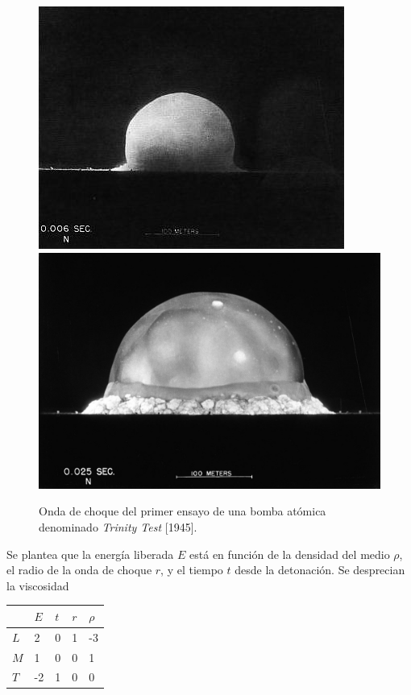   \begin{figure}[thb!]
  	\centering
  	\includegraphics[width=0.9\linewidth]{fig/trinity1.jpg}
  	\includegraphics[width=0.9\linewidth]{fig/trinity2.jpg}
  	\caption{Onda de choque del primer ensayo de una bomba atómica denominado \textit{Trinity Test} [1945]. }
  	\label{fig:trinity}
  \end{figure}
 
 Se plantea que la energía liberada $E$ está en función de la densidad del medio $\rho$, el radio de la onda de choque $r$, y el tiempo $t$ desde la detonación. Se desprecian la viscosidad 
 
\begin{table}[htb!]
	\centering
	\begin{tabular}{l||l|lll}
		& $E$ & $t$ & $r$ & $\rho$ \\ \hline
		$L$ & 2   & 0   & 1   & -3     \\ \hline
		$M$ & 1   & 0   & 0   & 1      \\ \hline
		$T$ & -2  & 1   & 0   & 0     
	\end{tabular}
\end{table}
 
